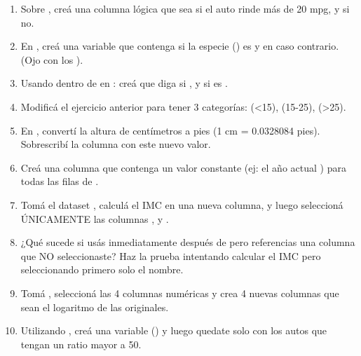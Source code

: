 \documentclass[8pt]{beamer}
\begin{document}
\begin{frame}[fragile]
	\begin{enumerate}[start=20]
		\item Sobre , cre\'a una columna lógica  que sea  si el auto rinde más de 20 mpg, y  si no.
		\item En , cre\'a una variable  que contenga  si la especie () es  y  en caso contrario. (Ojo con los ).
			\item Usando  dentro de  en : cre\'a  que diga  si , y  si es .
		
		\item Modific\'a el ejercicio anterior para tener 3 categorías:  (<15),  (15-25),  (>25).
		
		\item En , convert\'i la altura de centímetros a pies (1 cm = 0.0328084 pies). Sobrescrib\'i la columna  con este nuevo valor.
		
		\item Cre\'a una columna que contenga un valor constante (ej: el año actual ) para todas las filas de .
		
		\item Tom\'a el dataset , calcul\'a el IMC en una nueva columna, y luego seleccion\'a ÚNICAMENTE las columnas ,  y .
		
		\item ¿Qué sucede si us\'as  inmediatamente después de  pero referencias una columna que NO seleccionaste? Haz la prueba intentando calcular el IMC pero seleccionando primero solo el nombre.
		
		\item Tom\'a , seleccion\'a las 4 columnas numéricas y crea 4 nuevas columnas que sean el logaritmo de las originales.
		
		\item Utilizando , cre\'a una variable  () y luego quedate solo con los autos que tengan un ratio mayor a 50.
	\end{enumerate}
\end{frame}
\end{document}
